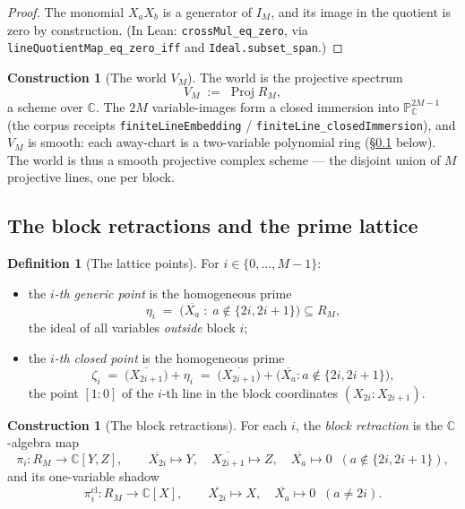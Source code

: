 \documentclass[11pt,a4paper]{article}
\theoremstyle{plain}
\theoremstyle{definition}
\newtheorem{definition}[theorem]{Definition}
\newtheorem{construction}[theorem]{Construction}
\newcommand{\C}{\mathbb{C}}
\newcommand{\PP}{\mathbb{P}}
\newcommand{\Proj}{\operatorname{Proj}}
\begin{document}
\begin{proof}
The monomial $X_aX_b$ is a generator of $I_M$, and its image in the
quotient is zero by construction.  (In Lean:
\texttt{crossMul\_eq\_zero}, via \texttt{lineQuotientMap\_eq\_zero\_iff}
and \texttt{Ideal.subset\_span}.)
\end{proof}

\begin{construction}[The world $V_M$]\label{con:world}
The world is the projective spectrum
\[
V_M \;:=\; \Proj R_M ,
\]
a scheme over $\C$.  The $2M$ variable-images form a closed immersion
into $\PP^{2M-1}_\C$ (the corpus receipts
\texttt{finiteLineEmbedding} / \texttt{finiteLine\_closedImmersion}),
and $V_M$ is smooth: each away-chart is a two-variable polynomial ring
(\S\ref{sec:lattice-charts} below).  The world is thus a smooth
projective complex scheme --- the disjoint union of $M$ projective
lines, one per block.
\end{construction}

\subsection{The block retractions and the prime lattice}
\label{sec:lattice-charts}

\begin{definition}[The lattice points]\label{def:lattice}
For $i \in \{0,\dots,M-1\}$:
\begin{itemize}
\item the \emph{$i$-th generic point} is the homogeneous prime
\[
\eta_i \;=\; \bigl( \overline{X_a} \;:\; a \notin \{2i, 2i+1\} \bigr)
\subseteq R_M ,
\]
the ideal of all variables \emph{outside} block $i$;
\item the \emph{$i$-th closed point} is the homogeneous prime
\[
\zeta_i \;=\; \bigl( \overline{X_{2i+1}} \bigr) + \eta_i
\;=\; \bigl( \overline{X_{2i+1}} \bigr) +
\bigl( \overline{X_a} : a \notin \{2i,2i+1\} \bigr),
\]
the point $[1:0]$ of the $i$-th line in the block coordinates
$(X_{2i}:X_{2i+1})$.
\end{itemize}
\end{definition}

\begin{construction}[The block retractions]\label{con:retraction}
For each $i$, the \emph{block retraction} is the $\C$-algebra map
\[
\pi_i : R_M \longrightarrow \C[Y,Z], \qquad
\overline{X_{2i}} \mapsto Y,\quad
\overline{X_{2i+1}} \mapsto Z,\quad
\overline{X_a} \mapsto 0 \;\; (a \notin \{2i,2i+1\}),
\]
and its one-variable shadow
\[
\pi_i^{\mathrm{cl}} : R_M \to \C[X], \qquad
\overline{X_{2i}} \mapsto X,\quad \overline{X_a} \mapsto 0 \;\;
(a \ne 2i).
\]
\end{construction}
\end{document}
